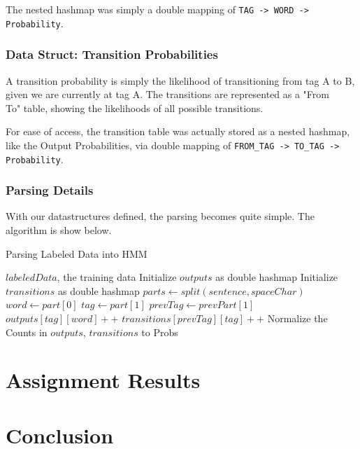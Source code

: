\documentclass[11pt]{article}
\begin{document}
The nested hashmap was simply a double mapping of \texttt{TAG -> WORD -> Probability}.

\subsubsection{Data Struct: Transition Probabilities}
A transition probability is simply the likelihood of transitioning from tag A to B, given
we are currently at tag A.  The transitions are represented as a "From\\To"
table, showing the likelihoods of all possible transitions.

For ease of access, the transition table was actually stored as a nested hashmap, like the Output
Probabilities, via double mapping of \texttt{FROM\_TAG -> TO\_TAG -> Probability}.

\subsubsection{Parsing Details}
With our datastructures defined, the parsing becomes quite simple.  The algorithm is show below.

\begin{algorithm}
\caption{Parsing Labeled Data into HMM}
\begin{algorithmic}[1]
\Require $labeledData$, the training data
\State Initialize $outputs$ as double hashmap
\State Initialize $transitions$ as double hashmap
\State $parts \gets split(sentence, spaceChar)$
\State $word \gets part[0] $
\State $tag \gets part[1] $
\State $prevTag \gets prevPart[1] $
\State $outputs[tag][word]++ $
\State $transitions[prevTag][tag]++ $
\EndFor
\EndFor
\State Normalize the Counts in $outputs$, $transitions$ to Probs
\end{algorithmic}
\end{algorithm}

\section{Assignment Results}


\section{Conclusion}
\end{document}
